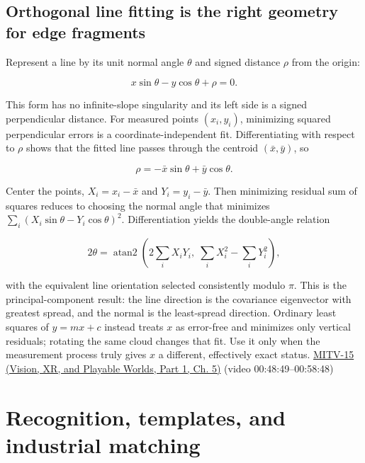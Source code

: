 \subsection{Orthogonal line fitting is the right geometry for edge fragments}\label{04-visual-computing-ii-ch030-orthogonal-line-fitting-is-the-right-geometry-for-edge-fragments}

\hypertarget{04-visual-computing-ii-ch030-orthogonal-line-fitting-is-the-right-geometry-for-edge-fragments}{}

Represent a line by its unit normal angle \(\theta\) and signed distance \(\rho\) from the origin:

\[
x\sin\theta-y\cos\theta+\rho=0.
\]

This form has no infinite-slope singularity and its left side is a signed perpendicular distance. For measured points \((x_i,y_i)\), minimizing squared perpendicular errors is a coordinate-independent fit. Differentiating with respect to \(\rho\) shows that the fitted line passes through the centroid \((\bar x,\bar y)\), so

\[
\rho=-\bar x\sin\theta+\bar y\cos\theta.
\]

Center the points, \(X_i=x_i-\bar x\) and \(Y_i=y_i-\bar y\). Then minimizing residual sum of squares reduces to choosing the normal angle that minimizes \(\sum_i(X_i\sin\theta-Y_i\cos\theta)^2\). Differentiation yields the double-angle relation

\[
2\theta=\operatorname{atan2}\left(2\sum_iX_iY_i,\;\sum_iX_i^2-\sum_iY_i^2\right),
\]

with the equivalent line orientation selected consistently modulo \(\pi\). This is the principal-component result: the line direction is the covariance eigenvector with greatest spread, and the normal is the least-spread direction. Ordinary least squares of \(y=mx+c\) instead treats \(x\) as error-free and minimizes only vertical residuals; rotating the same cloud changes that fit. Use it only when the measurement process truly gives \(x\) a different, effectively exact status. \href{../07-Vision-XR-and-Playable-Worlds-P01/main.pdf\#nameddest=04-visual-computing-ii-ch036-mitv-15---alignment-patmax-distance-field-filtering-and-sub-sampling-us-7065262}{MITV-15 (Vision, XR, and Playable Worlds, Part 1, Ch. 5)} (video 00:48:49--00:58:48)

\section{Recognition, templates, and industrial matching}\label{04-visual-computing-ii-ch030-recognition-templates-and-industrial-matching}

